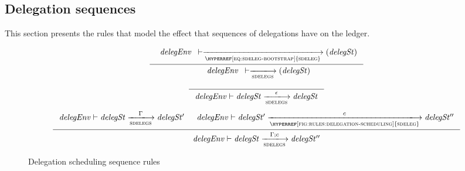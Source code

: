 \subsection{Delegation sequences}
\label{sec:delegation-sequences}

This section presents the rules that model the effect that sequences of
delegations have on the ledger.

\begin{figure}[htb]
  \begin{equation}
    \inference
    {
      {\begin{array}{l}
         \var{delegEnv}
      \end{array}}
      \vdash
      \trans{\hyperref[eq:sdeleg-bootstrap]{sdeleg}}{}
      \left(
        \var{delegSt}
      \right)
    }
    {
      {\begin{array}{l}
         \var{delegEnv}
      \end{array}}
      \vdash
      \trans{sdelegs}{}
      \left(
        \var{delegSt}
      \right)
    }
  \end{equation}
  \nextdef
  \begin{equation}
    \label{eq:rule:delegation-scheduling-seq-base}
    \inference
    {}
    {
      \var{delegEnv}
      \vdash
      \var{delegSt}
      \trans{sdelegs}{\epsilon}
      \var{delegSt}
    }
  \end{equation}
  \nextdef
  \begin{equation}
    \label{eq:rule:delegation-scheduling-seq-ind}
    \inference
    {
      \var{delegEnv}
      \vdash
      \var{delegSt}
      \trans{sdelegs}{\Gamma}
      \var{delegSt'}
      &
      \var{delegEnv}
      \vdash
      \var{delegSt'}
      \trans{\hyperref[fig:rules:delegation-scheduling]{sdeleg}}{c}
      \var{delegSt''}
    }
    {
      \var{delegEnv}
      \vdash
      \var{delegSt}
      \trans{sdelegs}{\Gamma; c}
      \var{delegSt''}
    }
  \end{equation}
  \caption{Delegation scheduling sequence rules}
  \label{fig:rules:delegation-scheduling-seq}
\end{figure}

